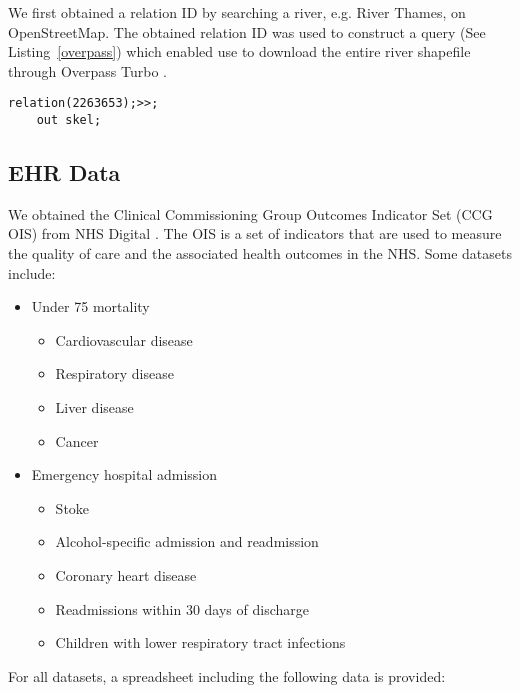 We first obtained a relation ID by searching a river, e.g. River Thames, on OpenStreetMap. The obtained relation ID was used to construct a query (See Listing~\ref{overpass}) which enabled use to download the entire river shapefile through Overpass Turbo \cite{overpassturboOverpass}.

\begin{lstlisting}[caption={The query that downloads the shapefile of River Thames from OpenStreetMap via Overpass Turbo API.}, label={overpass},captionpos=b]
    relation(2263653);>>;
    out skel;
\end{lstlisting}

\subsection{EHR Data}

We obtained the Clinical Commissioning Group Outcomes Indicator Set (CCG OIS) from NHS Digital \cite{nhsdigitalClinical}. The OIS is a set of indicators that are used to measure the quality of care and the associated health outcomes in the NHS. Some datasets include:
\begin{itemize}
    \item Under 75 mortality
    \begin{multicols}{2}
        \begin{itemize}
            \item Cardiovascular disease
            \item Respiratory disease
            \item Liver disease
            \item Cancer
        \end{itemize}
    \end{multicols}
    \item Emergency hospital admission
        \begin{itemize}
            \item Stoke
            \item Alcohol-specific admission and readmission
            \item Coronary heart disease
            \item Readmissions within 30 days of discharge
            \item Children with lower respiratory tract infections
        \end{itemize}
\end{itemize}

For all datasets, a spreadsheet including the following data is provided:

